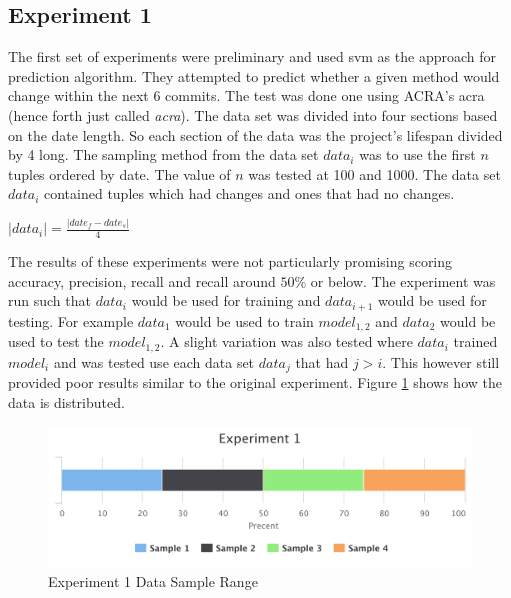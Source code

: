 


\subsection{Experiment 1}

The first set of experiments were preliminary and used \gls{svm} as the approach for prediction algorithm. They attempted to predict whether a given method would change within the next 6 commits. The test was done one using ACRA's acra (hence forth just called \textit{acra}). The data set was divided into four sections based on the date length. So each section of the data was the project's lifespan divided by 4 long. The sampling method from the data set $data_i$ was to use the first $n$ tuples ordered by date. The value of $n$ was tested at 100 and 1000. The data set $data_i$ contained tuples which had changes and ones that had no changes.

$|data_i| = \frac{|date_f - date_s|}{4}$

The results of these experiments were not particularly promising scoring accuracy, precision, recall and recall around $50\%$ or below. The experiment was run such that $data_i$ would be used for training and $data_{i+1}$ would be used for testing. For example $data_1$ would be used to train $model_{1,2}$ and $data_2$ would be used to test the $model_{1,2}$. A slight variation was also tested where $data_i$ trained $model_i$ and was tested use each data set $data_j$ that had $j > i$. This however still provided poor results similar to the original experiment. Figure \ref{fig:exp_1_data_range} shows how the data is distributed.

\begin{figure}[!ht]
    \centering
        \includegraphics[width=1.0\textwidth]{images/exp_1_data}
    \caption{Experiment 1 Data Sample Range}
    \label{fig:exp_1_data_range}
\end{figure}

